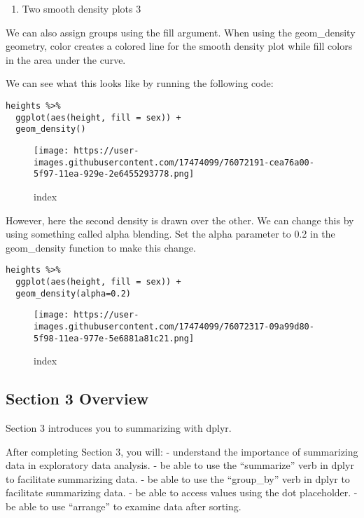 \documentclass[]{article}
\providecommand{\tightlist}{%
  \setlength{\itemsep}{0pt}\setlength{\parskip}{0pt}}
\begin{document}
\begin{enumerate}
\def\labelenumi{\arabic{enumi}.}
\setcounter{enumi}{21}
\tightlist
\item
  Two smooth density plots 3
\end{enumerate}

We can also assign groups using the fill argument. When using the
geom\_density geometry, color creates a colored line for the smooth
density plot while fill colors in the area under the curve.

We can see what this looks like by running the following code:

\begin{verbatim}
heights %>% 
  ggplot(aes(height, fill = sex)) + 
  geom_density() 
\end{verbatim}

\begin{figure}
\centering
\texttt{[image: https://user-images.githubusercontent.com/17474099/76072191-cea76a00-5f97-11ea-929e-2e6455293778.png]}
\caption{index}
\end{figure}

However, here the second density is drawn over the other. We can change
this by using something called alpha blending. Set the alpha parameter
to 0.2 in the geom\_density function to make this change.

\begin{verbatim}
heights %>% 
  ggplot(aes(height, fill = sex)) + 
  geom_density(alpha=0.2) 
\end{verbatim}

\begin{figure}
\centering
\texttt{[image: https://user-images.githubusercontent.com/17474099/76072317-09a99d80-5f98-11ea-977e-5e6881a81c21.png]}
\caption{index}
\end{figure}

\hypertarget{section-3-overview}{%
\subsection{Section 3 Overview}\label{section-3-overview}}

Section 3 introduces you to summarizing with dplyr.

After completing Section 3, you will: - understand the importance of
summarizing data in exploratory data analysis. - be able to use the
``summarize'' verb in dplyr to facilitate summarizing data. - be able to
use the ``group\_by'' verb in dplyr to facilitate summarizing data. - be
able to access values using the dot placeholder. - be able to use
``arrange'' to examine data after sorting.
\end{document}
